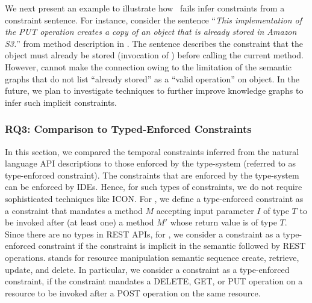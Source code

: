 We next present an example to illustrate how \tool\ fails infer constraints from a constraint sentence.
For instance, consider the sentence ``\textit{This implementation of the PUT operation creates a copy of an object that is already stored in Amazon S3.}''
from   method description in \amazonAPI.
The sentence describes the constraint that the object must already be stored (invocation of )
before calling the current method.
However, \tool cannot make the connection owing to the limitation of the semantic graphs that do not list ``already stored'' as a ``valid operation'' on object.  
In the future, we plan to investigate techniques to further improve knowledge graphs to infer such implicit constraints.


\subsubsection{RQ3: Comparison to Typed-Enforced Constraints}

In this section, we compared the temporal constraints inferred from the natural language API descriptions to those enforced by the type-system (referred to as type-enforced constraint).
The constraints that are enforced by the type-system can be enforced by IDEs.
Hence, for such types of constraints, we do not require sophisticated techniques like ICON. 
For , we define a type-enforced constraint as a constraint that mandates a method $M$ accepting input parameter $I$ of type $T$ to be invoked after (at least one) a method $M'$ whose return value is of type $T$. 
Since there are no types in REST APIs, for , we consider a constraint as a type-enforced constraint
if the constraint is implicit in the  semantic followed by REST operations. 
 stands for resource manipulation semantic sequence create, retrieve, update, and delete.
In particular, we consider a constraint as a type-enforced constraint, if the constraint mandates a DELETE, GET, or PUT operation on a resource to be invoked after a POST operation on the same resource. 

